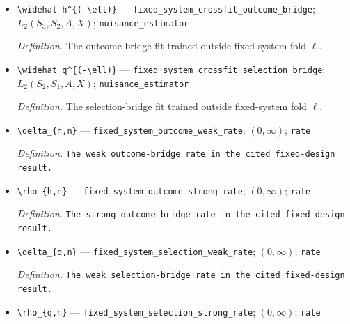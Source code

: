 \documentclass{article}
\begin{document}
\begin{itemize}
  \par\smallskip\noindent\emph{Definition.} The adjoint of \(\mathsf T_0\) in the cited fixed-system theorem.
  \item \texttt{\textbackslash{}\allowbreak{}widehat h\textasciicircum{}\{(-\allowbreak{}\textbackslash{}\allowbreak{}ell)\}\allowbreak{}} --- \texttt{fixed\_\allowbreak{}system\_\allowbreak{}crossfit\_\allowbreak{}outcome\_\allowbreak{}bridge}; \(L_2(S_3,S_2,A,X)\); \texttt{nuisance\_\allowbreak{}estimator}
  \par\smallskip\noindent\emph{Definition.} The outcome-bridge fit trained outside fixed-system fold \(\ell\).
  \item \texttt{\textbackslash{}\allowbreak{}widehat q\textasciicircum{}\{(-\allowbreak{}\textbackslash{}\allowbreak{}ell)\}\allowbreak{}} --- \texttt{fixed\_\allowbreak{}system\_\allowbreak{}crossfit\_\allowbreak{}selection\_\allowbreak{}bridge}; \(L_2(S_2,S_1,A,X)\); \texttt{nuisance\_\allowbreak{}estimator}
  \par\smallskip\noindent\emph{Definition.} The selection-bridge fit trained outside fixed-system fold \(\ell\).
  \item \texttt{\textbackslash{}\allowbreak{}delta\_\allowbreak{}\{h,\allowbreak{}n\}\allowbreak{}} --- \texttt{fixed\_\allowbreak{}system\_\allowbreak{}outcome\_\allowbreak{}weak\_\allowbreak{}rate}; \((0,\infty)\); \texttt{rate}
  \par\smallskip\noindent\emph{Definition.} \texttt{The weak outcome-\allowbreak{}bridge rate in the cited fixed-\allowbreak{}design result.}
  \item \texttt{\textbackslash{}\allowbreak{}rho\_\allowbreak{}\{h,\allowbreak{}n\}\allowbreak{}} --- \texttt{fixed\_\allowbreak{}system\_\allowbreak{}outcome\_\allowbreak{}strong\_\allowbreak{}rate}; \((0,\infty)\); \texttt{rate}
  \par\smallskip\noindent\emph{Definition.} \texttt{The strong outcome-\allowbreak{}bridge rate in the cited fixed-\allowbreak{}design result.}
  \item \texttt{\textbackslash{}\allowbreak{}delta\_\allowbreak{}\{q,\allowbreak{}n\}\allowbreak{}} --- \texttt{fixed\_\allowbreak{}system\_\allowbreak{}selection\_\allowbreak{}weak\_\allowbreak{}rate}; \((0,\infty)\); \texttt{rate}
  \par\smallskip\noindent\emph{Definition.} \texttt{The weak selection-\allowbreak{}bridge rate in the cited fixed-\allowbreak{}design result.}
  \item \texttt{\textbackslash{}\allowbreak{}rho\_\allowbreak{}\{q,\allowbreak{}n\}\allowbreak{}} --- \texttt{fixed\_\allowbreak{}system\_\allowbreak{}selection\_\allowbreak{}strong\_\allowbreak{}rate}; \((0,\infty)\); \texttt{rate}

\end{itemize}
\end{document}
